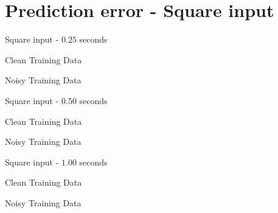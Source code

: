 \documentclass{beamer}
\begin{document}
\section{Prediction error - Square input}

\begin{frame}{Square input - $0.25$ seconds}
    \scriptsize
    \begin{table}[!ht]
        \centering
        \caption{Clean Training Data}
    \end{table}

    \begin{table}[!ht]
        \centering
        \caption{Noisy Training Data}
    \end{table}
\end{frame}

\begin{frame}{Square input - $0.50$ seconds}
    \scriptsize
    \begin{table}[!ht]
        \centering
        \caption{Clean Training Data}
    \end{table}

    \begin{table}[!ht]
        \centering
        \caption{Noisy Training Data}
    \end{table}
\end{frame}

\begin{frame}{Square input - $1.00$ seconds}
    \scriptsize
    \begin{table}[!ht]
        \centering
        \caption{Clean Training Data}
    \end{table}

    \begin{table}[!ht]
        \centering
        \caption{Noisy Training Data}
    \end{table}
\end{frame}
\end{document}
